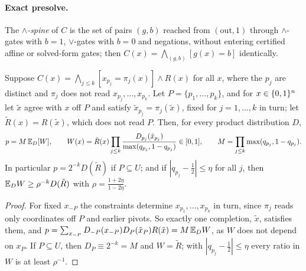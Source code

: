 \paragraph{Exact presolve.}
The \emph{$\wedge$-spine} of $C$ is the set of pairs $(g,b)$ reached from
$(\mathrm{out},1)$ through $\wedge$-gates with $b=1$, $\vee$-gates with $b=0$ and
negations, without entering certified affine or solved-form gates; then
$C(x)=\bigwedge_{(g,b)}[g(x)=b]$ identically.

\begin{proposition}\label{prop:presolve}
Suppose $C(x)=\bigwedge_{j\le k}[x_{p_j}=\pi_j(x)]\wedge R(x)$ for all $x$, where the
$p_j$ are distinct and $\pi_j$ does not read $x_{p_j},\dots,x_{p_k}$. Let
$P=\{p_1,\dots,p_k\}$, and for $x\in\{0,1\}^n$ let $\tilde x$ agree with $x$ off $P$
and satisfy $\tilde x_{p_j}=\pi_j(\tilde x)$, fixed for $j=1,\dots,k$ in turn; let
$\tilde R(x)=R(\tilde x)$, which does not read $P$. Then, for every product
distribution $D$,
\[
p=M\,\mathbb{E}_D[W],\qquad
W(x)=\tilde R(x)\prod_{j\le k}\frac{D_{p_j}(\tilde x_{p_j})}{\max(q_{p_j},1-q_{p_j})}\in[0,1],\qquad
M=\prod_{j\le k}\max(q_{p_j},1-q_{p_j}).
\]
In particular $p=2^{-k}D(\tilde R)$ if $P\subseteq U$; and if
$|q_{p_j}-\frac12|\le\eta$ for all $j$, then $\mathbb{E}_D W\ge\rho^{-k}D(\tilde R)$ with
$\rho=\frac{1+2\eta}{1-2\eta}$.
\end{proposition}

\begin{proof}
For fixed $x_{-P}$ the constraints determine $x_{p_1},\dots,x_{p_k}$ in turn, since
$\pi_j$ reads only coordinates off $P$ and earlier pivots. So exactly one completion,
$\tilde x$, satisfies them, and
$p=\sum_{x_{-P}}D_{-P}(x_{-P})D_P(\tilde x_P)R(\tilde x)=M\,\mathbb{E}_DW$, as $W$ does not
depend on $x_P$. If $P\subseteq U$, then $D_P\equiv2^{-k}=M$ and $W=\tilde R$; with
$|q_{p_j}-\frac12|\le\eta$ every ratio in $W$ is at least $\rho^{-1}$.
\end{proof}

